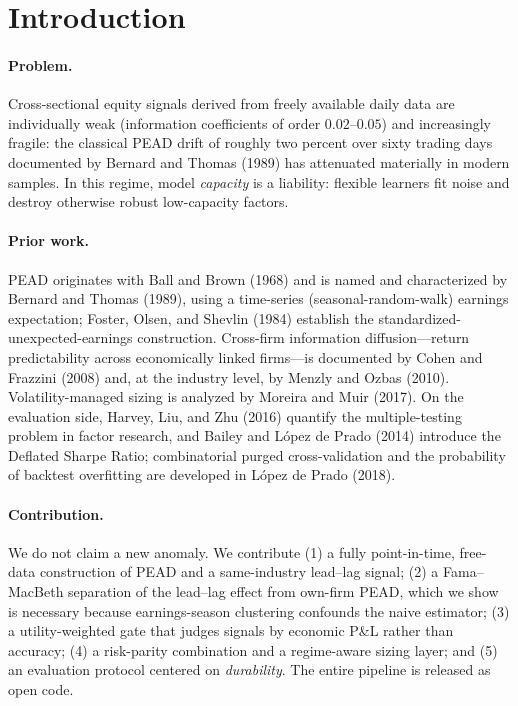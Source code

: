 \documentclass[11pt,a4paper]{article}
\theoremstyle{plain}
\theoremstyle{definition}
\begin{document}
\section{Introduction}
\label{sec:intro}

\paragraph{Problem.} Cross-sectional equity signals derived from freely available daily data are
individually weak (information coefficients of order $0.02$--$0.05$) and increasingly fragile: the
classical PEAD drift of roughly two percent over sixty trading days documented by Bernard and
Thomas (1989) has attenuated materially in modern samples. In this regime, model \emph{capacity}
is a liability: flexible learners fit noise and destroy otherwise robust low-capacity factors.

\paragraph{Prior work.} PEAD originates with Ball and Brown (1968) and is named and characterized
by Bernard and Thomas (1989), using a time-series (seasonal-random-walk) earnings expectation;
Foster, Olsen, and Shevlin (1984) establish the standardized-unexpected-earnings construction.
Cross-firm information diffusion---return predictability across economically linked firms---is
documented by Cohen and Frazzini (2008) and, at the industry level, by Menzly and Ozbas (2010).
Volatility-managed sizing is analyzed by Moreira and Muir (2017). On the evaluation side, Harvey,
Liu, and Zhu (2016) quantify the multiple-testing problem in factor research, and Bailey and
L\'opez de Prado (2014) introduce the Deflated Sharpe Ratio; combinatorial purged cross-validation
and the probability of backtest overfitting are developed in L\'opez de Prado (2018).

\paragraph{Contribution.} We do not claim a new anomaly. We contribute (1) a fully point-in-time,
free-data construction of PEAD and a same-industry lead--lag signal; (2) a Fama--MacBeth separation
of the lead--lag effect from own-firm PEAD, which we show is necessary because earnings-season
clustering confounds the naive estimator; (3) a utility-weighted gate that judges signals by
economic P\&L rather than accuracy; (4) a risk-parity combination and a regime-aware sizing layer;
and (5) an evaluation protocol centered on \emph{durability}. The entire pipeline is released as
open code.
\end{document}
